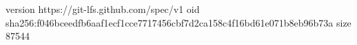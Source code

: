 version https://git-lfs.github.com/spec/v1
oid sha256:f046bceedfb6aaf1ecf1cce7717456cbf7d2ca158c4f16bd61e071b8eb96b73a
size 87544

